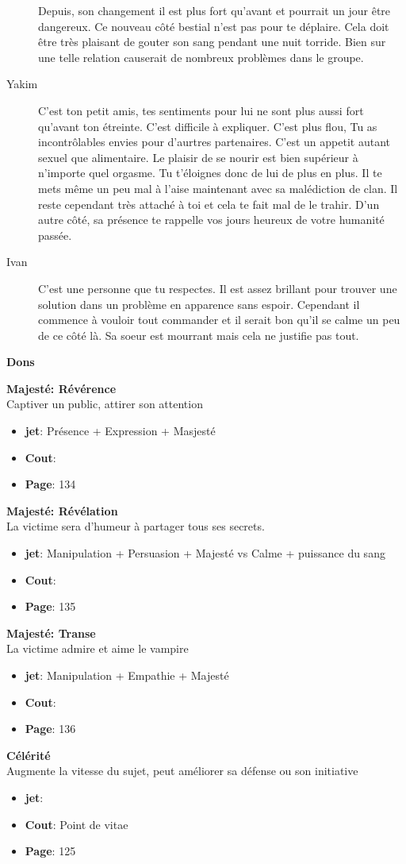\documentclass[oneside,12pt]{book}
\newcommand\don[5]{
\textbf{#1} \\
#2
\begin{itemize}
\item{ \textbf{jet}: #3}
\item{ \textbf{Cout}: #4}
\item{ \textbf{Page}: #5}
\end{itemize}
\vspace{0.5cm}
}
\begin{document}
\begin{flushleft}
\begin{description}
{Depuis, son changement il est plus fort qu'avant et pourrait un jour être dangereux. Ce nouveau côté bestial n'est pas pour te déplaire. Cela doit être très plaisant de gouter son sang pendant une nuit torride. Bien sur une telle relation causerait de nombreux problèmes dans le groupe.}
\item[Yakim]{C'est ton petit amis, tes sentiments pour lui ne sont plus aussi fort qu'avant ton étreinte. C'est difficile à expliquer. C'est plus flou, Tu as incontrôlables envies pour d'aurtres partenaires. C'est un appetit autant sexuel que alimentaire. Le plaisir de se nourir est bien supérieur à n'importe quel orgasme. Tu t'éloignes donc de lui de plus en plus. Il te mets même un peu mal à l'aise maintenant avec sa malédiction de clan. Il reste cependant très attaché à toi et cela te fait mal de le trahir. D'un autre côté, sa présence te rappelle vos jours heureux de votre humanité passée. }
\item[Ivan]{C'est une personne que tu respectes. Il est assez brillant pour trouver une solution dans un problème en apparence sans espoir. Cependant il commence à vouloir tout commander et il serait bon qu'il se calme un peu de ce côté là. Sa soeur est mourrant mais cela ne justifie pas tout.}
\end{description}
 
\clearpage
\textbf{\large Dons}
\vspace{0.5cm}

\don{Majesté: Révérence}{Captiver un public, attirer son attention}{Présence + Expression + Masjesté}{}{134}
\don{Majesté: Révélation}{La victime sera d'humeur à partager tous ses secrets.}{Manipulation + Persuasion + Majesté vs Calme + puissance du sang}{}{135}
\don{Majesté: Transe}{La victime admire et aime le vampire}{Manipulation + Empathie + Majesté}{}{136 }
\don{Célérité}{Augmente la vitesse du sujet, peut améliorer sa défense ou son initiative}{}{Point de vitae}{125}


\clearpage

\end{flushleft}
\end{document}
